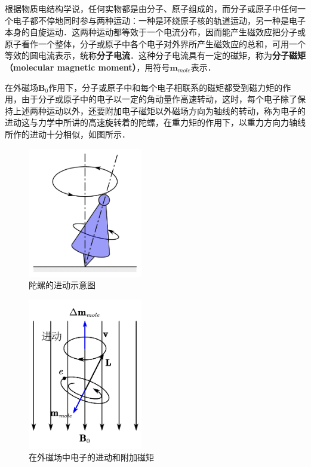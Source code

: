 
根据物质电结构学说，任何实物都是由分子、原子组成的，而分子或原子中任何一个电子都不停地同时参与两种运动：一种是环绕原子核的轨道运动，另一种是电子本身的自旋运动．这两种运动都等效于一个电流分布，因而能产生磁效应把分子或原子看作一个整体，分子或原子中各个电子对外界所产生磁效应的总和，可用一个等效的圆电流表示，统称\textbf{分子电流}．这种分子电流具有一定的磁矩，称为\textbf{分子磁矩（molecular magnetic moment）}，用符号$\mathbf m_{mole}$表示．

在外磁场$\mathbf B_0$作用下，分子或原子中和每个电子相联系的磁矩都受到磁力矩的作用，由于分子或原子中的电子以一定的角动量作高速转动，这时，每个电子除了保持上述两种运动以外，还要附加电子磁矩以外磁场方向为轴线的转动，称为电子的进动这与力学中所讲的高速旋转着的陀螺，在重力矩的作用下，以重力方向力轴线所作的进动十分相似，如图所示．
\begin{figure}[ht]
\centering
\includegraphics[width=5cm]{./figures/MoMaMo_1.pdf}
\caption{陀螺的进动示意图} \label{MoMaMo_fig1}
\end{figure}
\begin{figure}[ht]
\centering
\includegraphics[width=5cm]{./figures/MoMaMo_2.pdf}
\caption{在外磁场中电子的进动和附加磁矩} \label{MoMaMo_fig2}
\end{figure}
